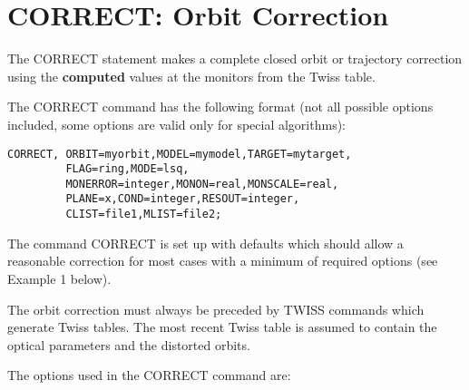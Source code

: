 
\section{CORRECT: Orbit Correction}  
\label{sec:correct}

The CORRECT statement makes a complete closed orbit  or trajectory
correction using the \textbf{computed} values at the monitors  from the
Twiss table.   

The CORRECT command has the following format (not all possible options
included, some options are valid only for special algorithms):  

\begin{verbatim}
CORRECT, ORBIT=myorbit,MODEL=mymodel,TARGET=mytarget,
         FLAG=ring,MODE=lsq,  
         MONERROR=integer,MONON=real,MONSCALE=real,
         PLANE=x,COND=integer,RESOUT=integer,
         CLIST=file1,MLIST=file2; 
\end{verbatim} 

The command CORRECT is set up with defaults which should allow a
reasonable correction for most cases with a minimum of required options
(see Example 1 below).  

The orbit correction must always be preceded by TWISS commands  which
generate Twiss tables. The most recent Twiss table is assumed to contain
the optical parameters and the distorted orbits. 

The options used in the CORRECT command are: 

